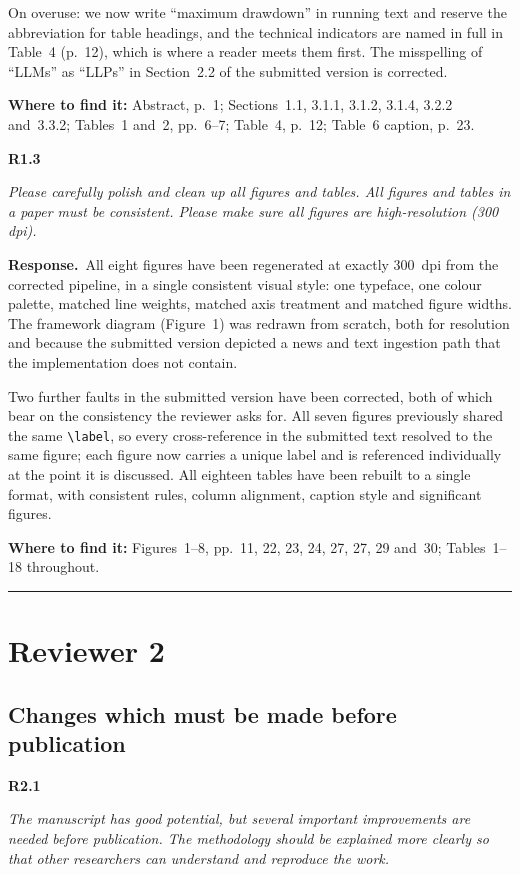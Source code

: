 \documentclass[11pt,a4paper]{article}
\newcommand{\rc}[2]{%
  \par\medskip\noindent
  \colorbox{qbg}{\parbox{\dimexpr\linewidth-2\fboxsep}{%
  \textbf{#1}\par\smallskip\itshape #2}}\par\nopagebreak}
\newcommand{\resp}{\par\medskip\noindent\textbf{Response.}\ }
\newcommand{\where}[1]{\par\smallskip\noindent\textcolor{blue!55!black}{\textbf{Where to find it:} #1}\par}
\begin{document}
On overuse: we now write ``maximum drawdown'' in running text and reserve the abbreviation
for table headings, and the technical indicators are named in full in Table~4 (p.~12),
which is where a reader meets them first. The misspelling of ``LLMs'' as ``LLPs'' in
Section~2.2 of the submitted version is corrected.
\where{Abstract, p.~1; Sections~1.1, 3.1.1, 3.1.2, 3.1.4, 3.2.2 and~3.3.2; Tables~1 and~2,
pp.~6--7; Table~4, p.~12; Table~6 caption, p.~23.}

\rc{R1.3}{Please carefully polish and clean up all figures and tables. All figures and
tables in a paper must be consistent. Please make sure all figures are high-resolution
(300 dpi).}

\resp All eight figures have been regenerated at exactly 300~dpi from the corrected
pipeline, in a single consistent visual style: one typeface, one colour palette, matched
line weights, matched axis treatment and matched figure widths. The framework diagram
(Figure~1) was redrawn from scratch, both for resolution and because the submitted version
depicted a news and text ingestion path that the implementation does not contain.

Two further faults in the submitted version have been corrected, both of which bear on the
consistency the reviewer asks for. All seven figures previously shared the same
\verb|\label|, so every cross-reference in the submitted text resolved to the same figure;
each figure now carries a unique label and is referenced individually at the point it is
discussed. All eighteen tables have been rebuilt to a single format, with consistent rules,
column alignment, caption style and significant figures.
\where{Figures~1--8, pp.~11, 22, 23, 24, 27, 27, 29 and~30; Tables~1--18 throughout.}

\bigskip
\noindent\rule{\linewidth}{1pt}
\section*{Reviewer 2}

\subsection*{Changes which must be made before publication}

\rc{R2.1}{The manuscript has good potential, but several important improvements are needed
before publication. The methodology should be explained more clearly so that other
researchers can understand and reproduce the work.}
\end{document}
